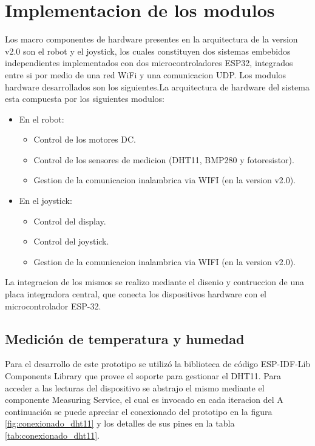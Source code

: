 \section{Implementacion de los modulos}

Los macro componentes de hardware presentes en la arquitectura de la version v2.0 son el robot y el joystick, los cuales constituyen dos sistemas embebidos independientes implementados con dos microcontroladores ESP32, integrados entre si por medio de una red WiFi y una comunicacion UDP. Los modulos hardware desarrollados son los siguientes.La arquitectura de hardware del sistema esta compuesta por los siguientes modulos:


\begin{itemize}
	\item En el robot:
	\begin{itemize}
		\item Control de los motores DC.	
		\item Control de los sensores de medicion (DHT11, BMP280 y fotoresistor).
		\item Gestion de la  comunicacion inalambrica via WIFI (en la version v2.0).
	\end{itemize}
	\item En el joystick:
	\begin{itemize}
		\item Control del display.
		\item Control del joystick.
		\item Gestion de la  comunicacion inalambrica via WIFI (en la version v2.0).
	\end{itemize}
\end{itemize}

La integracion de los mismos se realizo mediante el disenio y contruccion de una placa integradora central, que conecta los dispositivos hardware con el microcontrolador ESP-32.



\subsection{Medición de temperatura y humedad}

Para el desarrollo de este prototipo se utilizó la biblioteca de código ESP-IDF-Lib Components Library \cite{esp_idf_lib_website} que provee el soporte para gestionar el DHT11. Para acceder a las lecturas del dispositivo se abstrajo el mismo mediante el componente Measuring Service, el cual es invocado en cada iteracion del 
A continuación se puede apreciar el conexionado del prototipo en la figura \ref{fig:conexionado_dht11} y los detalles de sus pines en la tabla \ref{tab:conexionado_dht11}.

